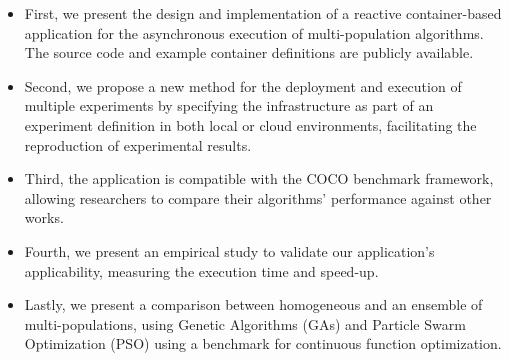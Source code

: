 \documentclass[review]{elsarticle}
\begin{document}
\begin{itemize}
    \item First, we present the design and implementation of a reactive 
    container-based application for the asynchronous execution of multi-population 
    algorithms. The source code and example container definitions are
    publicly available. %
    \item Second, we propose a new method for the deployment and execution of 
    multiple experiments by specifying the infrastructure as part of an 
    experiment definition in both local or cloud environments,
    facilitating the reproduction of experimental results. %
    \item Third, the application is compatible with the COCO benchmark 
    framework, allowing researchers to compare their 
    algorithms' performance against other works. %
    \item Fourth, we present an empirical study to validate 
    our application's applicability, measuring the execution time and speed-up.
    
    \item Lastly, we present a comparison between homogeneous and an ensemble of 
    multi-populations, using Genetic Algorithms (GAs) and Particle 
    Swarm Optimization (PSO) using a benchmark for 
    continuous function optimization. %
\end{itemize}
\end{document}
